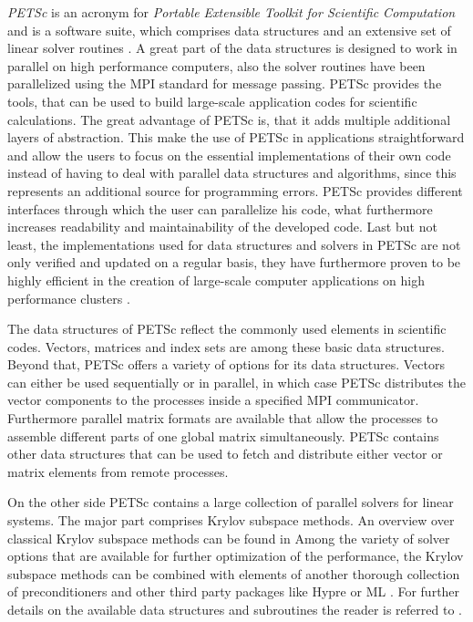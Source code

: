 \emph{PETSc} is an acronym for \emph{Portable Extensible Toolkit for Scientific Computation} and is a software suite, which comprises data structures and an extensive set of linear solver routines \cite{petsc-web-page,petsc-efficient}. A great part of the data structures is designed to work in parallel on high performance computers, also the solver routines have been parallelized using the MPI standard for message passing. PETSc provides the tools, that can be used to build large-scale application codes for scientific calculations. The great advantage of PETSc is, that it adds multiple additional layers of abstraction. This make the use of PETSc in applications straightforward and allow the users to focus on the essential implementations of their own code instead of having to deal with parallel data structures and algorithms, since this represents an additional source for programming errors. PETSc provides different interfaces through which the user can parallelize his code, what furthermore increases readability and maintainability of the developed code. Last but not least, the implementations used for data structures and solvers in PETSc are not only verified and updated on a regular basis, they have furthermore proven to be highly efficient in the creation of large-scale computer applications on high performance clusters \cite{bonfiglioli12,gropp00,karimian05}.

The data structures of PETSc reflect the commonly used elements in scientific codes. Vectors, matrices and index sets are among these basic data structures. Beyond that, PETSc offers a variety of options for its data structures. Vectors can either be used sequentially or in parallel, in which case PETSc distributes the vector components to the processes inside a specified MPI communicator. Furthermore parallel matrix formats are available that allow the processes to assemble different parts of one global matrix simultaneously. PETSc contains other data structures that can be used to fetch and distribute either vector or matrix elements from remote processes.

On the other side PETSc contains a large collection of parallel solvers for linear systems. The major part comprises Krylov subspace methods. An overview over classical Krylov subspace methods can be found in \cite{saad03} Among the variety of solver options that are available for further optimization of the performance, the Krylov subspace methods can be combined with elements of another thorough collection of preconditioners and other third party packages like Hypre \cite{hypre} or ML \cite{ml}. For further details on the available data structures and subroutines the reader is referred to \cite{petsc-user-ref,petsc-web-page}.


